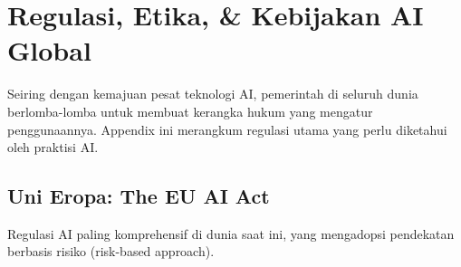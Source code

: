 \chapter{Regulasi, Etika, \& Kebijakan AI Global}
\label{chap:regulation}

Seiring dengan kemajuan pesat teknologi AI, pemerintah di seluruh dunia berlomba-lomba untuk membuat kerangka hukum yang mengatur penggunaannya. Appendix ini merangkum regulasi utama yang perlu diketahui oleh praktisi AI.

\section{Uni Eropa: The EU AI Act}
Regulasi AI paling komprehensif di dunia saat ini, yang mengadopsi pendekatan berbasis risiko (risk-based approach).


